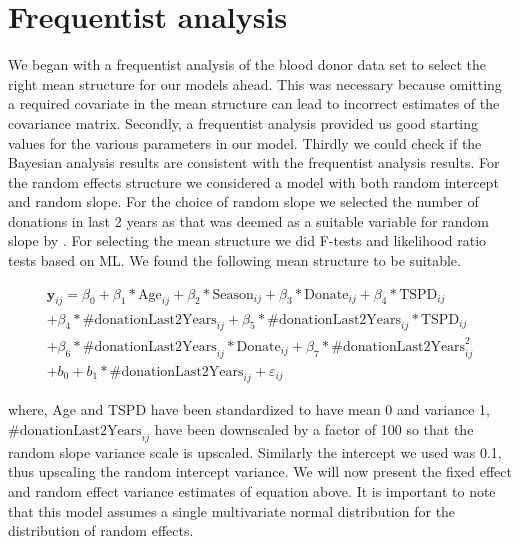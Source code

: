 \section{Frequentist analysis}
\label{sec : frequentist_blood_donor}
We began with a frequentist analysis of the blood donor data set to select the right mean structure for our models ahead. This was necessary because omitting a required covariate in the mean structure can lead to incorrect estimates of the covariance matrix. Secondly, a frequentist analysis provided us good starting values for the various parameters in our model. Thirdly we could check if the Bayesian analysis results are consistent with the frequentist analysis results. For the random effects structure we considered a model with both random intercept and random slope. For the choice of random slope we selected the number of donations in last 2 years as that was deemed as a suitable variable for random slope by \citet{nasserinejad_prevalence_2015}. For selecting the mean structure we did F-tests and likelihood ratio tests based on ML. We found the following mean structure to be suitable.

\begin{equation}
\label{eq : blood_donor_model}
\begin{split}
\boldsymbol{y}_{ij} = \beta_0 + \beta_1*\text{Age}_{ij} + \beta_2*\text{Season}_{ij} + \beta_3*\text{Donate}_{ij} + \beta_4*\text{TSPD}_{ij}\\
+ \beta_4*\text{\#donationLast2Years}_{ij} + \beta_5*\text{\#donationLast2Years}_{ij}*\text{TSPD}_{ij}\\
+ \beta_6*\text{\#donationLast2Years}_{ij}*\text{Donate}_{ij} + \beta_7*\text{\#donationLast2Years}_{ij}^2\\
+ b_0 + b_1 * \text{\#donationLast2Years}_{ij} + \varepsilon_{ij}
\end{split}
\end{equation}

where, Age and TSPD have been standardized to have mean 0 and variance 1, $\text{\#donationLast2Years}_{ij}$ have been downscaled by a factor of 100 so that the random slope variance scale is upscaled. Similarly the intercept we used was 0.1, thus upscaling the random intercept variance. We will now present the fixed effect and random effect variance estimates of equation above. It is important to note that this model assumes a single multivariate normal distribution for the distribution of random effects.


